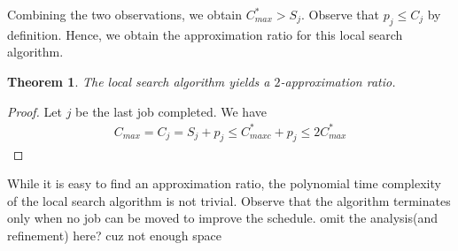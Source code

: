 \documentclass[11pt,psfig,times]{article}
\newtheorem{theorem}{Theorem}
\begin{document}
Combining the two observations, we obtain $C_{max}^* > S_j$. Observe that $p_j \leq C_j$ by definition. 
Hence, we obtain the approximation ratio for this local search algorithm.
\begin{theorem}
    \label{theorem:localsearch}
    The local search algorithm yields a $2$-approximation ratio.
\end{theorem}
\begin{proof}
    Let $j$ be the last job completed. We have
    \begin{align*}
        C_{max} = C_j = S_j + p_j \leq C_{maxc}^* + p_j \leq 2C_{max}^*
    \end{align*}
\end{proof}
While it is easy to find an approximation ratio, the polynomial time complexity of the local search algorithm 
is not trivial. Observe that the algorithm terminates only when no job can be moved to improve the schedule. 
\color{red} omit the analysis(and refinement) here? cuz not enough space \color{black} 
\end{document}
